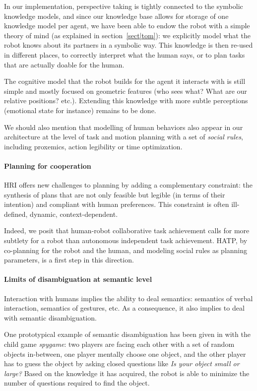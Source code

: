 \documentclass[preprint,3p,times]{elsarticle}
\begin{document}
In our implementation, perspective taking is tightly connected to the symbolic
knowledge models, and since our knowledge base allows for storage of one
knowledge model per agent, we have been able to endow the robot with a simple
theory of mind (as explained in section~\ref{sect|tom}): we explicitly model
what the robot knows about its partners in a symbolic way. This knowledge is
then re-used in different places, to correctly interpret what the human says,
or to plan tasks that are actually doable for the human.

The cognitive model that the robot builds for the agent it interacts with is
still simple and mostly focused on geometric features (who sees what? What are
our relative positions? etc.). Extending this knowledge with more subtle
perceptions (emotional state for instance) remains to be done.

We should also mention that modelling of human behaviors also appear in our
architecture at the level of task and motion planning with a set of
\emph{social rules}, including proxemics, action legibility or time
optimization.

\paragraph{Planning for cooperation} HRI offers new challenges to planning
by adding a complementary constraint: the synthesis of plans that are not only
feasible but legible (in terms of their intention) and compliant with human
preferences. This constraint is often ill-defined, dynamic, context-dependent.

Indeed, we posit that human-robot collaborative task achievement calls for more
subtlety for a robot than autonomous independent task achievement. HATP, by
co-planning for the robot and the human, and modeling social rules as planning
parameters, is a first step in this direction.

\paragraph{Limits of disambiguation at semantic level}

Interaction with humans implies the ability to deal semantics: semantics of
verbal interaction, semantics of gestures, etc.  As a consequence, it also
implies to deal with semantic disambiguation.

One prototypical example of semantic disambiguation has been given in
\cite{Ros2010b} with the child game \emph{spygame}: two players are facing
each other with a set of random objects in-between, one player mentally choose
one object, and the other player has to guess the object by asking closed
questions like \emph{Is your object small or large?} Based on the knowledge it
has acquired, the robot is able to minimize the number of questions required to
find the object.
\end{document}
